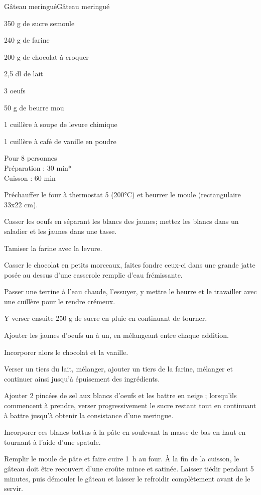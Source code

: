 \begin{recette}{Gâteau meringué}{Gâteau meringué}

\begin{ingredients}
350 g de sucre semoule\par
240 g de farine\par
200 g de chocolat à croquer\par
2,5 dl de lait\par
3 oeufs\par
50 g de beurre mou\par
1 cuillère à soupe de levure chimique\par
1 cuillère à café de vanille en poudre\par
\end{ingredients}

\begin{infos}
Pour 8 personnes\\
Préparation : 30 min*	\\
Cuisson : 60 min\\
\end{infos}

\begin{etapes}
\item Préchauffer le four à thermostat 5 (200°C) et beurrer le moule (rectangulaire 33x22 cm).
\item Casser les oeufs en séparant les blancs des jaunes; mettez les blancs dans un saladier et les jaunes dans une tasse.
\item Tamiser la farine avec la levure.
\item Casser le chocolat en petits morceaux, faites fondre ceux-ci dans une grande jatte posée au dessus d'une casserole remplie d'eau frémissante.
\item Passer une terrine à l'eau chaude, l'essuyer, y mettre le beurre et le travailler avec une cuillère pour le rendre crémeux.
\item Y verser ensuite 250 g de sucre en pluie en continuant de tourner.
\item Ajouter les jaunes d'oeufs un à un, en mélangeant entre chaque addition.
\item Incorporer alors le chocolat et la vanille.
\item Verser un tiers du lait, mélanger, ajouter un tiers de la farine, mélanger et continuer ainsi jusqu'à épuisement des ingrédients.
\item Ajouter 2 pincées de sel aux blancs d'oeufs et les battre en neige ; lorsqu'ils commencent à prendre, verser progressivement le sucre restant tout en continuant à battre jusqu'à obtenir la consistance d'une meringue.
\item Incorporer ces blancs battus à la pâte en soulevant la masse de bas en haut en tournant à l'aide d'une spatule.
\item Remplir le moule de pâte et faire cuire 1~h au four. À la fin de la cuisson, le gâteau doit être recouvert d'une croûte mince et satinée. Laisser tiédir pendant 5 minutes, puis démouler le gâteau et laisser le refroidir complètement avant de le servir.
\end{etapes}

\end{recette}